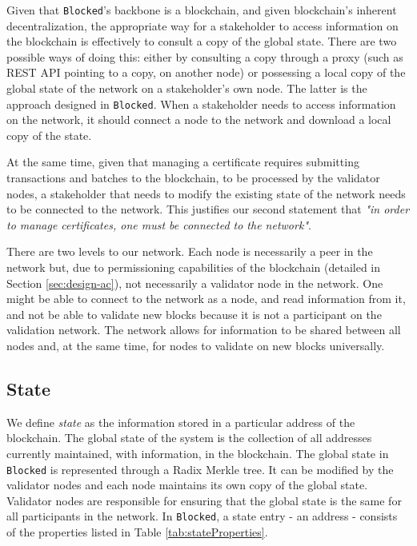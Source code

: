 Given that \texttt{Blocked}'s backbone is a blockchain, and given blockchain's inherent decentralization, the appropriate way for a stakeholder to access information on the blockchain is effectively to consult a copy of the global state. There are two possible ways of doing this: either by consulting a copy through a proxy (such as REST API pointing to a copy, on another node) or possessing a local copy of the global state of the network on a stakeholder's own node. The latter is the approach designed in \texttt{Blocked}. When a stakeholder needs to access information on the network, it should connect a node to the network and download a local copy of the state.

At the same time, given that managing a certificate requires submitting transactions and batches to the blockchain, to be processed by the validator nodes, a stakeholder that needs to modify the existing state of the network needs to be connected to the network. This justifies our second statement that \emph{"in order to manage certificates, one must be connected to the network"}.

There are two levels to our network. Each node is necessarily a peer in the network but, due to permissioning capabilities of the blockchain (detailed in Section \ref{sec:design-ac}), not necessarily a validator node in the network. One might be able to connect to the network as a node, and read information from it, and not be able to validate new blocks because it is not a participant on the validation network. The network allows for information to be shared between all nodes and, at the same time, for nodes to validate on new blocks universally.

\subsection{State}
\label{sec:design-state}

We define \textit{state} as the information stored in a particular address of the blockchain. The global state of the system is the collection of all addresses currently maintained, with information, in the blockchain. The global state in \texttt{Blocked} is represented through a Radix Merkle tree. It can be modified by the validator nodes and each node maintains its own copy of the global state. Validator nodes are responsible for ensuring that the global state is the same for all participants in the network. In \texttt{Blocked}, a state entry - an address - consists of the properties listed in Table \ref{tab:stateProperties}.

